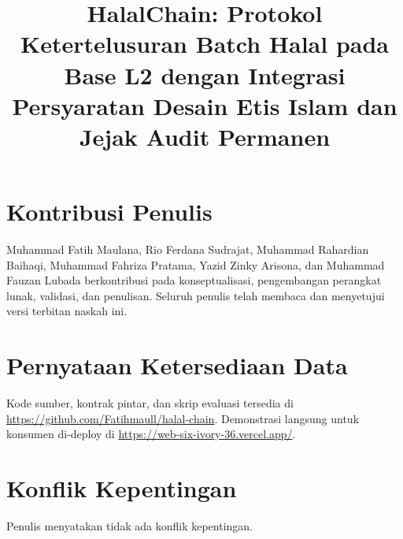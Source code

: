 \documentclass[journal]{IEEEtran}
\begin{document}
\title{HalalChain: Protokol Ketertelusuran Batch Halal pada Base L2 dengan Integrasi Persyaratan Desain Etis Islam dan Jejak Audit Permanen}

\author{%
}


\maketitle











\section*{Kontribusi Penulis}
Muhammad Fatih Maulana, Rio Ferdana Sudrajat, Muhammad Rahardian Baihaqi, Muhammad Fahriza Pratama, Yazid Zinky Arisona, dan Muhammad Fauzan Lubada berkontribusi pada konseptualisasi, pengembangan perangkat lunak, validasi, dan penulisan.
Seluruh penulis telah membaca dan menyetujui versi terbitan naskah ini.

\section*{Pernyataan Ketersediaan Data}
Kode sumber, kontrak pintar, dan skrip evaluasi tersedia di \url{https://github.com/Fatihmaull/halal-chain}.
Demonstrasi langsung untuk konsumen di-deploy di \url{https://web-six-ivory-36.vercel.app/}.

\section*{Konflik Kepentingan}
Penulis menyatakan tidak ada konflik kepentingan.

\appendices




\end{document}
